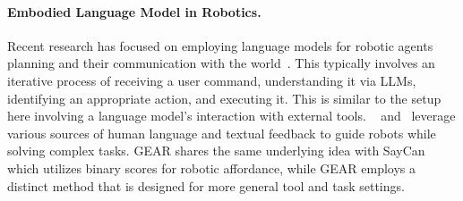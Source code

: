 \documentclass[11pt]{article}
\newcommand{\name}{{\fontfamily{cmss}\selectfont GEAR}}
\begin{document}
\paragraph{Embodied Language Model in Robotics.} 
Recent research has focused on employing language models for robotic agents planning and their communication with the world~\citep{driess2023palm, zhao2023chat, song2022llm, huang2023grounded,vemprala2023chatgpt}. This typically involves an 
iterative process of receiving a user command, understanding it via LLMs, identifying an appropriate action, and executing it. This is similar to the setup here involving a language model's interaction with external tools.
~\citet{huang2022inner} and~\citet{lynch2022interactive} leverage various sources of human language and textual feedback to guide robots while solving complex tasks. 
\name{} shares the same underlying idea with SayCan~\citep{saycan2022arxiv} which utilizes binary scores for robotic affordance, while \name{} employs a distinct method that is designed for more general tool and task settings.

\end{document}
